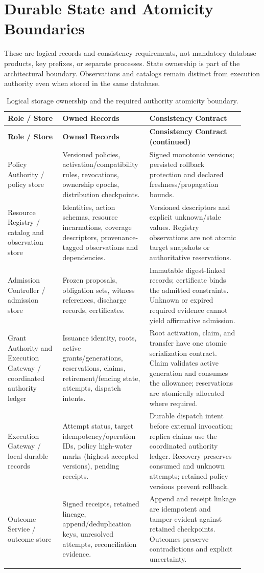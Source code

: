 \section{Durable State and Atomicity Boundaries}
\label{sec:app-storage}

These are logical records and consistency requirements, not mandatory database products, key prefixes, or separate processes. State ownership is part of the architectural boundary. Observations and catalogs remain distinct from execution authority even when stored in the same database.

\small
\begin{longtable}{L{0.22\linewidth}L{0.32\linewidth}L{0.38\linewidth}}
\toprule
\textbf{Role / Store} & \textbf{Owned Records} & \textbf{Consistency Contract}\\
\midrule
\endfirsthead
\toprule
\textbf{Role / Store} & \textbf{Owned Records} & \textbf{Consistency Contract (continued)}\\
\midrule
\endhead
Policy Authority / policy store & Versioned policies, activation/compatibility rules, revocations, ownership epochs, distribution checkpoints. & Signed monotonic versions; persisted rollback protection and declared freshness/propagation bounds.\\
Resource Registry / catalog and observation store & Identities, action schemas, resource incarnations, coverage descriptors, provenance-tagged observations and dependencies. & Versioned descriptors and explicit unknown/stale values. Registry observations are not atomic target snapshots or authoritative reservations.\\
Admission Controller / admission store & Frozen proposals, obligation sets, witness references, discharge records, certificates. & Immutable digest-linked records; certificate binds the admitted constraints. Unknown or expired required evidence cannot yield affirmative admission.\\
Grant Authority and Execution Gateway / coordinated authority ledger & Issuance identity, roots, active grants/generations, reservations, claims, retirement/fencing state, attempts, dispatch intents. & Root activation, claim, and transfer have one atomic serialization contract. Claim validates active generation and consumes the allowance; reservations are atomically allocated where required.\\
Execution Gateway / local durable records & Attempt status, target idempotency/operation IDs, policy high-water marks (highest accepted versions), pending receipts. & Durable dispatch intent before external invocation; replica claims use the coordinated authority ledger. Recovery preserves consumed and unknown attempts; retained policy versions prevent rollback.\\
Outcome Service / outcome store & Signed receipts, retained lineage, append/deduplication keys, unresolved attempts, reconciliation evidence. & Append and receipt linkage are idempotent and tamper-evident against retained checkpoints. Outcomes preserve contradictions and explicit uncertainty.\\
\bottomrule
\caption{Logical storage ownership and the required authority atomicity boundary.}
\label{tab:storage-keys}
\end{longtable}

